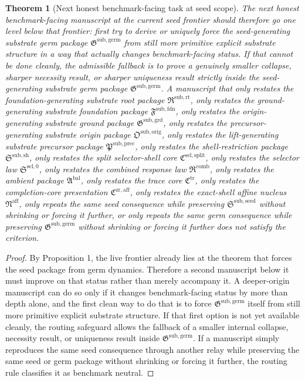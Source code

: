 \documentclass[11pt]{article}
\newcommand{\FoundationPackage}{\mathfrak F^{\mathrm{sub,fdn}}}
\newcommand{\GroundPackage}{\mathfrak G^{\mathrm{sub,grd}}}
\newcommand{\OriginPackage}{\mathfrak O^{\mathrm{sub,orig}}}
\newcommand{\PrecursorPackage}{\mathfrak P^{\mathrm{sub,prec}}}
\newcommand{\ShellRestriction}{\mathfrak S^{\mathrm{sub,sh}}}
\newcommand{\SelectorCore}{\mathfrak C^{\mathrm{sel,split}}}
\newcommand{\SelectorLaw}{\mathfrak S^{\mathrm{sel},0}}
\newcommand{\CombinedLaw}{\mathfrak R^{\mathrm{comb}}}
\newcommand{\AmbientPackage}{\mathfrak A^{\mathrm{bal}}}
\newcommand{\TraceCore}{\mathfrak C^{\mathrm{tr}}}
\newcommand{\CompletionCore}{\mathfrak C^{\mathrm{zr,aff}}}
\newcommand{\AffineNucleus}{\mathfrak N^{\mathrm{aff}}}
\newcommand{\RootPackage}{\mathfrak R^{\mathrm{sub,rt}}}
\newcommand{\SeedPackage}{\mathfrak S^{\mathrm{sub,seed}}}
\newcommand{\GermPackage}{\mathfrak G^{\mathrm{sub,germ}}}
\newtheorem{theorem}{Theorem}
\begin{document}
\begin{theorem}[Next honest benchmark-facing task at seed scope]
The next honest benchmark-facing manuscript at the current seed frontier should therefore go one level below that frontier: first try to derive or uniquely force the seed-generating substrate germ package \(\GermPackage\) from still more primitive explicit substrate structure in a way that actually changes benchmark-facing status. If that cannot be done cleanly, the admissible fallback is to prove a genuinely smaller collapse, sharper necessity result, or sharper uniqueness result strictly inside the seed-generating substrate germ package \(\GermPackage\). A manuscript that only restates the foundation-generating substrate root package \(\RootPackage\), only restates the ground-generating substrate foundation package \(\FoundationPackage\), only restates the origin-generating substrate ground package \(\GroundPackage\), only restates the precursor-generating substrate origin package \(\OriginPackage\), only restates the lift-generating substrate precursor package \(\PrecursorPackage\), only restates the shell-restriction package \(\ShellRestriction\), only restates the split selector-shell core \(\SelectorCore\), only restates the selector law \(\SelectorLaw\), only restates the combined response law \(\CombinedLaw\), only restates the ambient package \(\AmbientPackage\), only restates the trace core \(\TraceCore\), only restates the completion-core presentation \(\CompletionCore\), only restates the exact-shell affine nucleus \(\AffineNucleus\), only repeats the same seed consequence while preserving \(\SeedPackage\) without shrinking or forcing it further, or only repeats the same germ consequence while preserving \(\GermPackage\) without shrinking or forcing it further does not satisfy the criterion.
\end{theorem}

\begin{proof}
By Proposition 1, the live frontier already lies at the theorem that forces the seed package from germ dynamics. Therefore a second manuscript below it must improve on that status rather than merely accompany it. A deeper-origin manuscript can do so only if it changes benchmark-facing status by more than depth alone, and the first clean way to do that is to force \(\GermPackage\) itself from still more primitive explicit substrate structure. If that first option is not yet available cleanly, the routing safeguard allows the fallback of a smaller internal collapse, necessity result, or uniqueness result inside \(\GermPackage\). If a manuscript simply reproduces the same seed consequence through another relay while preserving the same seed or germ package without shrinking or forcing it further, the routing rule classifies it as benchmark neutral.
\end{proof}
\end{document}
